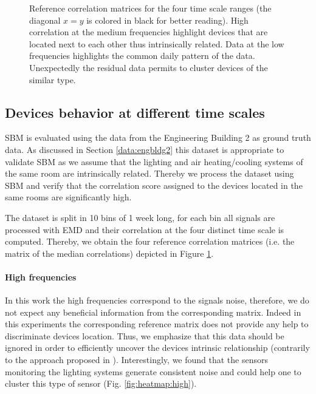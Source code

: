 \begin{figure}[t!]
\caption{Reference correlation matrices for the four time scale ranges (the diagonal $x=y$ is colored in black for better reading). High correlation at the medium frequencies highlight devices that are located next to each other thus intrinsically related. Data at the low frequencies highlights the common daily pattern of the data. Unexpectedly the residual data permits to cluster devices of the similar type.}
\label{fig:heatmap}
\end{figure}

\subsection{Devices behavior at different time scales}
SBM is evaluated using the data from the Engineering Building 2 as ground truth data.
As discussed in Section \ref{data:engbldg2} this dataset is appropriate to validate SBM as we assume that the lighting and air heating/cooling systems of the same room are intrinsically related.
Thereby we process the dataset using SBM and verify that the correlation score assigned to the devices located in the same rooms are significantly high.

The dataset is split in 10 bins of 1 week long, for each bin all signals are processed with EMD and their correlation at the four distinct time scale is computed. 
Thereby, we obtain the four reference correlation matrices (i.e. the matrix of the median correlations) depicted in Figure \ref{fig:heatmap}.

\paragraph{High frequencies}
In this work the high frequencies correspond to the signals noise, therefore, we do not expect any beneficial information from the corresponding matrix.
Indeed in this experiments the corresponding reference matrix does not provide any help to discriminate devices location.
Thus, we emphasize that this data should be ignored in order to efficiently uncover the devices intrinsic relationship (contrarily to the approach proposed in \cite{romain:iotapp12}).
Interestingly, we found that the sensors monitoring the lighting systems generate consistent noise and could help one to cluster this type of sensor (Fig. \ref{fig:heatmap:high}).
  
